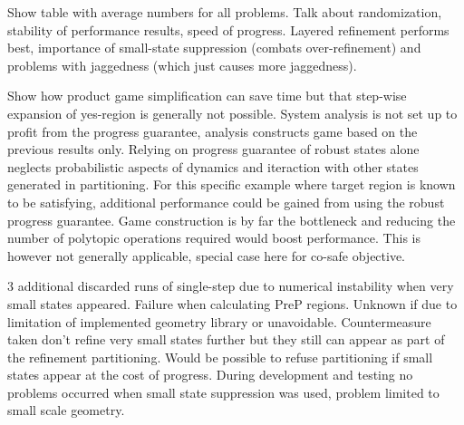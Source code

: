     Show table with average numbers for all problems.
    Talk about randomization, stability of performance results, speed of progress.
    Layered refinement performs best, importance of small-state suppression (combats over-refinement) and problems with jaggedness (which just causes more jaggedness).

    Show how product game simplification can save time but that step-wise expansion of yes-region is generally not possible.
    System analysis is not set up to profit from the progress guarantee, analysis constructs game based on the previous results only.
    Relying on progress guarantee of robust states alone neglects probabilistic aspects of dynamics and iteraction with other states generated in partitioning.
    For this specific example where target region is known to be satisfying, additional performance could be gained from using the robust progress guarantee.
    Game construction is by far the bottleneck and reducing the number of polytopic operations required would boost performance.
    This is however not generally applicable, special case here for co-safe objective.

    3 additional discarded runs of single-step due to numerical instability when very small states appeared.
    Failure when calculating PreP regions.
    Unknown if due to limitation of implemented geometry library or unavoidable.
    Countermeasure taken don't refine very small states further but they still can appear as part of the refinement partitioning.
    Would be possible to refuse partitioning if small states appear at the cost of progress.
    During development and testing no problems occurred when small state suppression was used, problem limited to small scale geometry.

\stopsubsection

